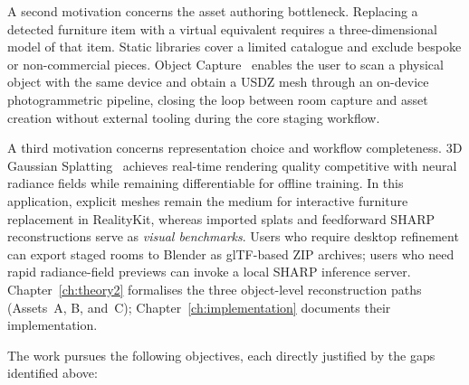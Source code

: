 A second motivation concerns the asset authoring bottleneck. Replacing a
detected furniture item with a virtual equivalent requires a three-dimensional
model of that item. Static libraries cover a limited catalogue and exclude
bespoke or non-commercial pieces. Object Capture~\cite{apple2024roomplan2}
enables the user to scan a physical object with the same device and obtain a
USDZ mesh through an on-device photogrammetric pipeline, closing the loop
between room capture and asset creation without external tooling during the
core staging workflow.

A third motivation concerns representation choice and workflow completeness.
3D Gaussian Splatting~\cite{kerbl20233dgs} achieves real-time rendering quality
competitive with neural radiance fields while remaining differentiable for
offline training. In this application, explicit meshes remain the medium for
interactive furniture replacement in RealityKit, whereas imported splats and
feedforward SHARP reconstructions serve as \emph{visual benchmarks}. Users who
require desktop refinement can export staged rooms to Blender as glTF-based ZIP
archives; users who need rapid radiance-field previews can invoke a local SHARP
inference server. Chapter~\ref{ch:theory2} formalises the three object-level
reconstruction paths (Assets~A, B, and~C); Chapter~\ref{ch:implementation}
documents their implementation.

The work pursues the following objectives, each directly justified by the
gaps identified above:


